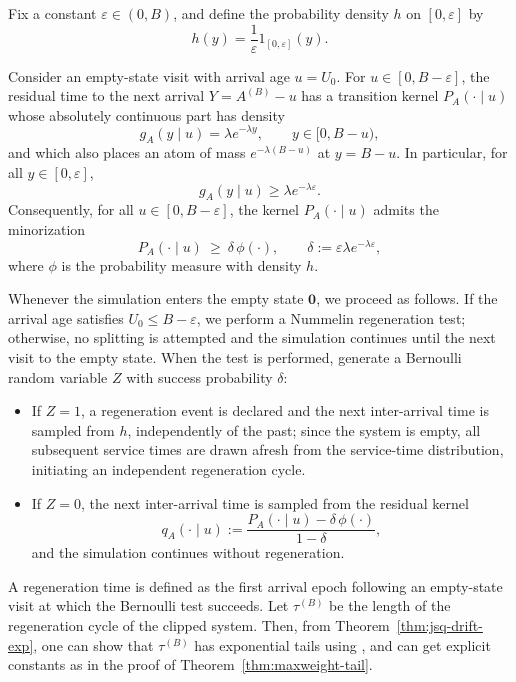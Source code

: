 \documentclass[11pt]{article}
\begin{document}
Fix a constant $\varepsilon\in(0,B)$, and define the probability density $h$ on
$[0,\varepsilon]$ by
\[
h(y)=\frac{1}{\varepsilon}1_{[0,\varepsilon]}(y).
\]

Consider an empty-state visit with arrival age $u=U_0$.
For $u\in[0,B-\varepsilon]$, the residual time to the next arrival
$Y=A^{(B)}-u$ has a transition kernel $P_A(\cdot\mid u)$ whose absolutely
continuous part has density
\[
g_A(y\mid u)=\lambda e^{-\lambda y}, \qquad y\in[0,B-u),
\]
and which also places an atom of mass $e^{-\lambda(B-u)}$ at $y=B-u$.
In particular, for all $y\in[0,\varepsilon]$,
\[
g_A(y\mid u)\ge \lambda e^{-\lambda\varepsilon}.
\]
Consequently, for all $u\in[0,B-\varepsilon]$, the kernel $P_A(\cdot\mid u)$
admits the minorization
\[
P_A(\cdot\mid u)\ \ge\ \delta\,\phi(\cdot),
\qquad
\delta:=\varepsilon\lambda e^{-\lambda\varepsilon},
\]
where $\phi$ is the probability measure with density $h$.

Whenever the simulation enters the empty state $\mathbf 0$, we proceed as follows.
If the arrival age satisfies $U_0\le B-\varepsilon$, we perform a Nummelin
regeneration test; otherwise, no splitting is attempted and the simulation
continues until the next visit to the empty state.
When the test is performed, generate a Bernoulli random variable $Z$ with success
probability $\delta$:
\begin{itemize}
\item If $Z=1$, a regeneration event is declared and the next inter-arrival time
is sampled from $h$, independently of the past; since the system is empty, all
subsequent service times are drawn afresh from the service-time distribution,
initiating an independent regeneration cycle.
\item If $Z=0$, the next inter-arrival time is sampled from the residual kernel
\[
q_A(\cdot\mid u)
:=\frac{P_A(\cdot\mid u)-\delta\,\phi(\cdot)}{1-\delta},
\]
and the simulation continues without regeneration.
\end{itemize}

A regeneration time is defined as the first arrival epoch following an empty-state visit
at which the Bernoulli test succeeds.
Let $\tau^{(B)}$ be the length of the regeneration cycle of the clipped system. Then, from Theorem~\ref{thm:jsq-drift-exp}, one can show that $\tau^{(B)}$ has exponential tails using \cite{hajek1982hitting,meyn1993stability}, and can get explicit constants as in the proof of Theorem~\ref{thm:maxweight-tail}.
\end{document}
